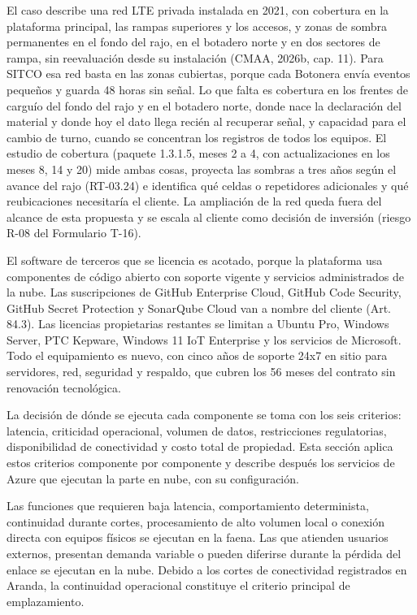 \documentclass[subdoc]{../../comun/overfore}
\begin{document}
El caso describe una red LTE privada instalada en 2021, con cobertura en la plataforma principal, las rampas superiores y los accesos, y zonas de sombra permanentes en el fondo del rajo, en el botadero norte y en dos sectores de rampa, sin reevaluación desde su instalación (CMAA, 2026b, cap. 11). Para SITCO esa red basta en las zonas cubiertas, porque cada Botonera envía eventos pequeños y guarda 48 horas sin señal. Lo que falta es cobertura en los frentes de carguío del fondo del rajo y en el botadero norte, donde nace la declaración del material y donde hoy el dato llega recién al recuperar señal, y capacidad para el cambio de turno, cuando se concentran los registros de todos los equipos. El estudio de cobertura (paquete 1.3.1.5, meses 2 a 4, con actualizaciones en los meses 8, 14 y 20) mide ambas cosas, proyecta las sombras a tres años según el avance del rajo (RT-03.24) e identifica qué celdas o repetidores adicionales y qué reubicaciones necesitaría el cliente. La ampliación de la red queda fuera del alcance de esta propuesta y se escala al cliente como decisión de inversión (riesgo R-08 del Formulario T-16).

El software de terceros que se licencia es acotado, porque la plataforma usa componentes de código abierto con soporte vigente y servicios administrados de la nube. Las suscripciones de GitHub Enterprise Cloud, GitHub Code Security, GitHub Secret Protection y SonarQube Cloud van a nombre del cliente (Art. 84.3). Las licencias propietarias restantes se limitan a Ubuntu Pro, Windows Server, PTC Kepware, Windows 11 IoT Enterprise y los servicios de Microsoft. Todo el equipamiento es nuevo, con cinco años de soporte 24x7 en sitio para servidores, red, seguridad y respaldo, que cubren los 56 meses del contrato sin renovación tecnológica.

La decisión de dónde se ejecuta cada componente se toma con los seis criterios: latencia, criticidad operacional, volumen de datos, restricciones regulatorias, disponibilidad de conectividad y costo total de propiedad. Esta sección aplica estos criterios componente por componente y describe después los servicios de Azure que ejecutan la parte en nube, con su configuración.

Las funciones que requieren baja latencia, comportamiento determinista, continuidad durante cortes, procesamiento de alto volumen local o conexión directa con equipos físicos se ejecutan en la faena. Las que atienden usuarios externos, presentan demanda variable o pueden diferirse durante la pérdida del enlace se ejecutan en la nube. Debido a los cortes de conectividad registrados en Aranda, la continuidad operacional constituye el criterio principal de emplazamiento.
\end{document}
